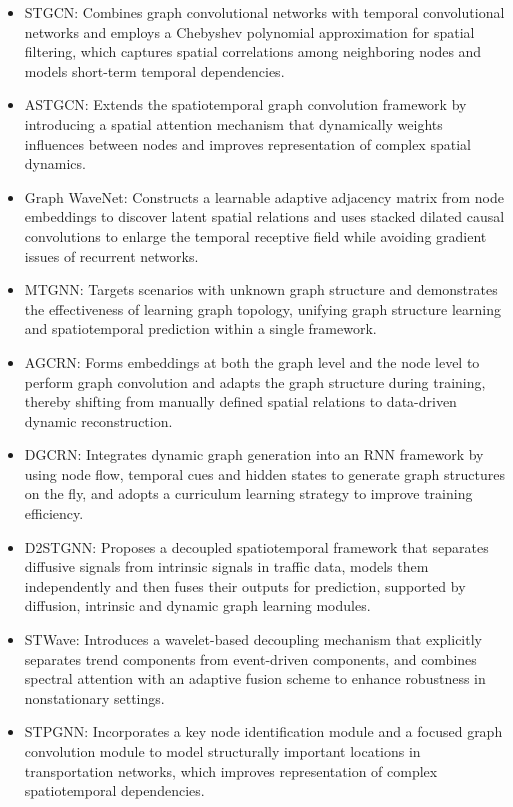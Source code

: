 \documentclass[preprint,12pt,authoryear]{elsarticle}
\begin{document}
\begin{itemize}
    \item STGCN: Combines graph convolutional networks with temporal convolutional networks and employs a Chebyshev polynomial approximation for spatial filtering, which captures spatial correlations among neighboring nodes and models short-term temporal dependencies.
    \item ASTGCN: Extends the spatiotemporal graph convolution framework by introducing a spatial attention mechanism that dynamically weights influences between nodes and improves representation of complex spatial dynamics.
    \item Graph WaveNet: Constructs a learnable adaptive adjacency matrix from node embeddings to discover latent spatial relations and uses stacked dilated causal convolutions to enlarge the temporal receptive field while avoiding gradient issues of recurrent networks.
    \item MTGNN: Targets scenarios with unknown graph structure and demonstrates the effectiveness of learning graph topology, unifying graph structure learning and spatiotemporal prediction within a single framework.
    \item AGCRN: Forms embeddings at both the graph level and the node level to perform graph convolution and adapts the graph structure during training, thereby shifting from manually defined spatial relations to data-driven dynamic reconstruction.
    \item DGCRN: Integrates dynamic graph generation into an RNN framework by using node flow, temporal cues and hidden states to generate graph structures on the fly, and adopts a curriculum learning strategy to improve training efficiency.
    \item D2STGNN: Proposes a decoupled spatiotemporal framework that separates diffusive signals from intrinsic signals in traffic data, models them independently and then fuses their outputs for prediction, supported by diffusion, intrinsic and dynamic graph learning modules.
    \item STWave: Introduces a wavelet-based decoupling mechanism that explicitly separates trend components from event-driven components, and combines spectral attention with an adaptive fusion scheme to enhance robustness in nonstationary settings.
    \item STPGNN: Incorporates a key node identification module and a focused graph convolution module to model structurally important locations in transportation networks, which improves representation of complex spatiotemporal dependencies.
\end{itemize}
\end{document}
